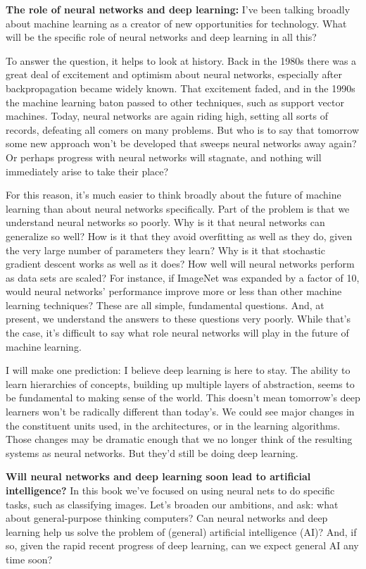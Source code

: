 \documentclass[a4paper,twoside,10pt]{book}
\begin{document}
\textbf{The role of neural networks and deep learning:} I've been talking broadly about machine learning as a creator of new opportunities for technology. What will be the specific role of neural networks and deep learning in all this?

To answer the question, it helps to look at history. Back in the 1980s there was a great deal of excitement and optimism about neural networks, especially after backpropagation became widely known. That excitement faded, and in the 1990s the machine learning baton passed to other techniques, such as support vector machines. Today, neural networks are again riding high, setting all sorts of records, defeating all comers on many problems. But who is to say that tomorrow some new approach won't be developed that sweeps neural networks away again? Or perhaps progress with neural networks will stagnate, and nothing will immediately arise to take their place?

For this reason, it's much easier to think broadly about the future of machine learning than about neural networks specifically. Part of the problem is that we understand neural networks so poorly. Why is it that neural networks can generalize so well? How is it that they avoid overfitting as well as they do, given the very large number of parameters they learn? Why is it that stochastic gradient descent works as well as it does? How well will neural networks perform as data sets are scaled? For instance, if ImageNet was expanded by a factor of 10, would neural networks' performance improve more or less than other machine learning techniques? These are all simple, fundamental questions. And, at present, we understand the answers to these questions very poorly. While that's the case, it's difficult to say what role neural networks will play in the future of machine learning.

I will make one prediction: I believe deep learning is here to stay. The ability to learn hierarchies of concepts, building up multiple layers of abstraction, seems to be fundamental to making sense of the world. This doesn't mean tomorrow's deep learners won't be radically different than today's. We could see major changes in the constituent units used, in the architectures, or in the learning algorithms. Those changes may be dramatic enough that we no longer think of the resulting systems as neural networks. But they'd still be doing deep learning.


\textbf{Will neural networks and deep learning soon lead to artificial intelligence?} In this book we've focused on using neural nets to do specific tasks, such as classifying images. Let's broaden our ambitions, and ask: what about general-purpose thinking computers? Can neural networks and deep learning help us solve the problem of (general) artificial intelligence (AI)? And, if so, given the rapid recent progress of deep learning, can we expect general AI any time soon?
\end{document}
